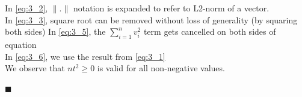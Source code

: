 \documentclass[12pt,a4paper]{article}
\newcommand{\rightqed}{
\begin{flushright}
$\blacksquare$
\end{flushright}
}
\begin{document}
In \eqref{eq:3_2}, $\|.\|$ notation is expanded to refer to L2-norm of a vector.\\
\indent In \eqref{eq:3_3}, square root can be removed without loss of generality (by squaring both sides)
\indent In \eqref{eq:3_5}, the $\sum_{i=1}^nv_i^2$ term gets cancelled on both sides of equation \\
\indent In \eqref{eq:3_6}, we use the result from \eqref{eq:3_1} \\

We observe that $nt^2 \geq 0$ is valid for all non-negative values.
\rightqed
\end{document}
